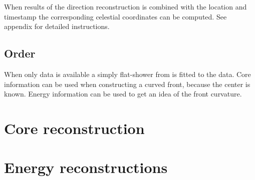 When results of the direction reconstruction is combined with the \gps
location and timestamp the corresponding celestial coordinates can be
computed. See appendix for detailed instructions.


\subsection{Order}

When only data is available a simply flat-shower from is fitted to the
data. Core information can be used when constructing a curved front,
because the center is known. Energy information can be used to get an
idea of the front curvature.


\section{Core reconstruction}



\section{Energy reconstructions}

